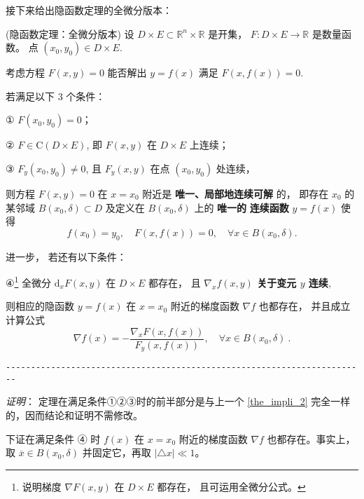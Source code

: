 接下来给出隐函数定理的全微分版本：
 \begin{theorem}{(隐函数定理：全微分版本)}
 设 $D\times E\subset\mathbb{R}^{n}\times\mathbb{R}$ 是开集， $F:D\times E\rightarrow\mathbb{R}$
是数量函数。 点 $(x_{0},y_{0})\in D\times E.$ 

考虑方程 $F(x,y)=0$ 能否解出 $y=f(x)$ 满足 $F(x,f(x))=0.$ 

若满足以下 3 个条件：

① $F(x_{0},y_{0})=0$；

② $F\in\mathrm{C}(D\times E)$, 即 $F(x,y)$ 在 $D\times E$ 上连续； 

③ $F_{y}(x_{0},y_{0})\neq0$, 且 $F_{y}(x,y)$ 在点 $(x_0,y_0)$ 处连续，

则方程 $F(x,y)=0$ 在 $x=x_{0}$ 附近是\textbf{ 唯一、局部地连续可解} 的， 即存在 $x_{0}$
的某邻域 $B(x_{0},\delta)\subset D$ 及定义在 $B(x_{0},\delta)$ 上的 \textbf{唯一的} \textbf{
连续函数} $y=f(x)$ 使得
\[
f(x_{0})=y_{0},\quad F(x,f(x))=0,\quad\forall x\in B(x_{0},\delta).
\]

进一步， 若还有以下条件：

④\footnote{说明梯度 $\nabla F(x,y)$ 在 $D\times E$ 都存在， 且可运用全微分公式。} 全微分 $\mathrm{d}_{x}F(x,y)$ 在 $D\times E$ 都存在， 且 \textbf{$\nabla_x f(x,y)$ 关于变元 $y$ 连续},

则相应的隐函数 $y=f(x)$ 在 $x=x_{0}$ 附近的梯度函数 $\nabla f$ 也都存在， 并且成立计算公式
\[
\nabla f(x)=-{\displaystyle \frac{\nabla_{x}F(x,f(x))}{F_{y}(x,f(x))}},\quad\forall x\in B(x_{0},\delta)~.
\]

\verb|------------------------------------------------------------------------|

\textsl{证明}： 定理在满足条件①②③时的前半部分是与上一个 \autoref{the_impli_2} 完全一样的，因而结论和证明不需修改。

下证在满足条件 ④ 时 $f(x)$ 在 $x=x_{0}$ 附近的梯度函数 $\nabla f$ 也都存在。事实上， 取 $\overline{x}\in B(x_{0},\delta)$ 并固定它，再取 $\left|\triangle x\right|\ll1$。 %


\end{theorem}
